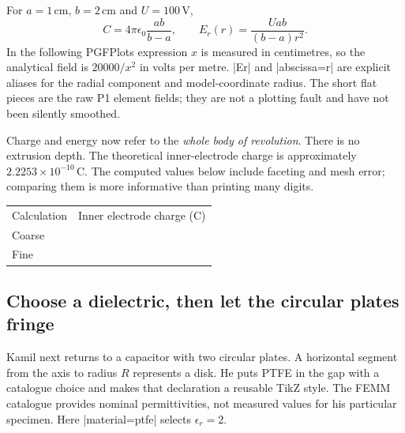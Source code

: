 For $a=1\,\mathrm{cm}$, $b=2\,\mathrm{cm}$ and $U=100\,\mathrm V$,
\[
 C=4\pi\epsilon_0\frac{ab}{b-a},\qquad
 E_r(r)=\frac{Uab}{(b-a)r^2}.
\]
In the following PGFPlots expression $x$ is measured in centimetres, so the
analytical field is $20000/x^2$ in volts per metre. |Er| and |abscissa=r|
are explicit aliases for the radial component and model-coordinate radius.
The short flat pieces are the raw P1 element fields; they are not a plotting
fault and have not been silently smoothed.

\begin{codeexample}[width=0pt]
\end{codeexample}

Charge and energy now refer to the \emph{whole body of revolution}. There is
no extrusion depth. The theoretical inner-electrode charge is approximately
$2.2253\times10^{-10}\,\mathrm C$. The computed values below include faceting
and mesh error; comparing them is more informative than printing many digits.

\begin{codeexample}[width=0pt]
\begin{tabular}{lr}
Calculation & Inner electrode charge (C)\\
Coarse & \femmelectricvalue[model=spherical coarse,electrode=inner,
  quantity=charge]\\
Fine & \femmelectricvalue[model=spherical fine,electrode=inner,
  quantity=charge]\\
\end{tabular}
\end{codeexample}

\subsection{Choose a dielectric, then let the circular plates fringe}
Kamil next returns to a capacitor with two circular plates. A horizontal
segment from the axis to radius $R$ represents a disk. He puts PTFE in the
gap with a catalogue choice and makes that declaration a reusable TikZ style.
The FEMM catalogue provides nominal permittivities, not measured values for
his particular specimen. Here |material=ptfe| selects $\epsilon_r=2$.


